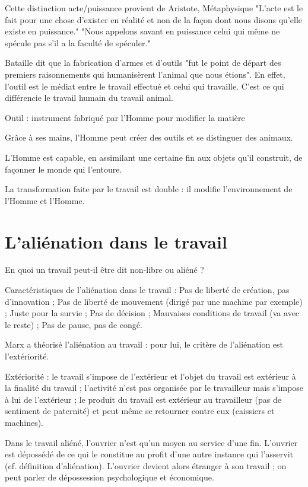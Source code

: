 \documentclass[french]{book}
\theoremstyle{definition}
\begin{document}
Cette distinction acte/puissance provient de 
Aristote, Métaphysique
"L'acte est le fait pour une chose d'exister en réalité et non de la façon dont nous disons qu'elle existe en puissance."
"Nous appelons savant en puissance celui qui même ne spécule pas s'il a la faculté de spéculer."

Bataille dit que la fabrication d'armes et d'outils "fut le point de départ des premiers raisonnements qui humanisèrent l'animal que nous étions". En effet, l'outil est le médiat entre le travail effectué et celui qui travaille. C'est ce qui différencie le travail humain du travail animal.

Outil : instrument fabriqué par l'Homme pour modifier la matière

Grâce à ses mains, l'Homme peut créer des outils et se distinguer des animaux.

L'Homme est capable, en assimilant une certaine fin aux objets qu'il construit, de façonner le monde qui l'entoure.

La transformation faite par le travail est double : il modifie l'environnement de l'Homme et l'Homme.


\section{L'aliénation dans le travail}

En quoi un travail peut-il être dit non-libre ou aliéné ?

Caractéristiques de l'aliénation dans le travail :
Pas de liberté de création, pas d'innovation ;
Pas de liberté de mouvement (dirigé par une machine par exemple) ;
Juste pour la survie ;
Pas de décision ;
Mauvaises conditions de travail (va avec le reste) ;
Pas de pause, pas de congé.

Marx a théorisé l'aliénation au travail : pour lui, le critère de l'aliénation est l'extériorité.

Extériorité :
le travail s’impose de l’extérieur et l’objet du travail est extérieur à la finalité du travail ;
l’activité n’est pas organisée par le travailleur mais s’impose à lui de l’extérieur ;
le produit du travail est extérieur au travailleur (pas de sentiment de paternité) et peut même se retourner contre eux (caissiers et machines).

Dans le travail aliéné, l’ouvrier n’est qu’un moyen au service d’une fin. L’ouvrier est dépossédé de ce qui le constitue au profit d’une autre instance qui l’asservit (cf. définition d’aliénation). L’ouvrier devient alors étranger à son travail ;  on peut parler de dépossession psychologique et économique.
\end{document}

